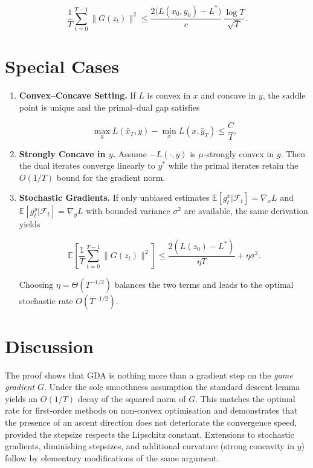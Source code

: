 \documentclass{article}
\begin{document}
\[
\frac{1}{T}\sum_{t=0}^{T-1}\|G(z_t)\|^{2}
\le \frac{2\bigl(L(x_0,y_0)-L^*\bigr)}{c}\,\frac{\log T}{\sqrt{T}} .
\]

\section*{Special Cases}
\begin{enumerate}[label=\arabic*.]
\item \textbf{Convex–Concave Setting.}  
If \(L\) is convex in \(x\) and concave in \(y\), the saddle point is unique and the primal–dual gap satisfies  

\[
\max_{y}\!L(\bar x_T,y)-\min_{x}\!L(x,\bar y_T)\le \frac{C}{T}.
\]

\item \textbf{Strongly Concave in \(y\).}  
Assume \(-L(\cdot,y)\) is \(\mu\)-strongly convex in \(y\).  Then the dual iterates converge linearly to \(y^*\) while the primal iterates retain the \(O(1/T)\) bound for the gradient norm.

\item \textbf{Stochastic Gradients.}  
If only unbiased estimates \(\mathbb{E}[g^x_t|\mathcal F_t]=\nabla_x L\) and \(\mathbb{E}[g^y_t|\mathcal F_t]=\nabla_y L\) with bounded variance \(\sigma^2\) are available, the same derivation yields  

\[
\mathbb{E}\!\left[\frac{1}{T}\sum_{t=0}^{T-1}\|G(z_t)\|^{2}\right]
\le \frac{2(L(z_0)-L^*)}{\eta T}+ \eta \sigma^2 .
\]

Choosing \(\eta = \Theta(T^{-1/2})\) balances the two terms and leads to the optimal stochastic rate \(O(T^{-1/2})\).
\end{enumerate}

\section*{Discussion}
The proof shows that GDA is nothing more than a gradient step on the \emph{game gradient} \(G\).  Under the sole smoothness assumption the standard descent lemma yields an \(O(1/T)\) decay of the squared norm of \(G\).  This matches the optimal rate for first‑order methods on non‑convex optimisation and demonstrates that the presence of an ascent direction does not deteriorate the convergence speed, provided the stepsize respects the Lipschitz constant.  Extensions to stochastic gradients, diminishing stepsizes, and additional curvature (strong concavity in \(y\)) follow by elementary modifications of the same argument.
\end{document}
